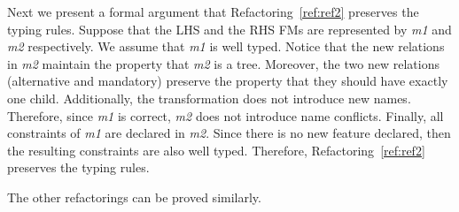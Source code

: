 Next we present a formal argument that Refactoring~\ref{ref:ref2} preserves the typing rules. Suppose that the LHS and the RHS FMs are represented by \emph{m1} and \emph{m2} respectively. We assume that \emph{m1} is well typed. Notice that the new relations in \emph{m2} maintain the property that \emph{m2} is a tree. Moreover, the two new relations (alternative and mandatory) preserve the property that they should have exactly one child. Additionally, the transformation does not introduce new names. Therefore, since \emph{m1} is correct, \emph{m2} does not introduce name conflicts. Finally, all constraints of \emph{m1} are declared in \emph{m2}. Since there is no new feature declared, then the resulting constraints are also well typed. Therefore, Refactoring~\ref{ref:ref2} preserves the typing rules.

The other refactorings can be proved similarly.

